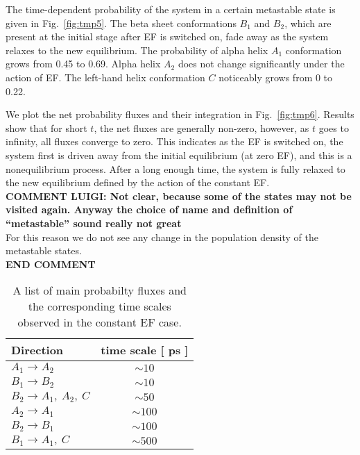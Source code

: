 \documentclass[a4paper,preprint,unsortedaddress,onecolumn]{revtex4-1}
\begin{document}
The time-dependent probability of the system in a certain metastable state is given in
Fig.~\ref{fig:tmp5}. The beta sheet conformations $B_1$ and $B_2$,
which are present at the initial stage after EF is switched on,
fade away as the system relaxes to the new equilibrium. The
probability of alpha helix $A_1$ conformation grows from 0.45 to 0.69.
Alpha helix $A_2$  does not change significantly  under the action of EF.
The left-hand helix conformation $C$ noticeably grows from 0 to 0.22.

We plot the net probability fluxes and their integration in Fig.~\ref{fig:tmp6}.
Results show that for short $t$, the net fluxes are generally non-zero, however, 
as $t$ goes to infinity,
all fluxes converge to zero. This indicates
as the EF is switched on, the system first is driven away from the initial
equilibrium (at zero EF), and this is a nonequilibrium process.
After a long enough time, the system
is fully relaxed to the new equilibrium defined by the action of the constant EF.\\
{\bf COMMENT LUIGI: Not clear, because some of the states may not be visited again. Anyway the choice of name and definition of ``metastable'' sound really not great}\\
For this reason we do not see any change
in the population density of the metastable states.\\
{\bf END COMMENT}\\

\begin{table}
  \centering
  \begin{tabular*}{0.4\textwidth}{@{\extracolsep{\fill}}lc}\hline\hline
    Direction        & time scale [ ps ] \\\hline
    $A_1\rightarrow A_2$        &       $\sim 10$      \\
    $B_1\rightarrow B_2$        &       $\sim 10$      \\    
    $B_2\rightarrow A_1,\ A_2,\ C$        &       $\sim 50$      \\    
    $A_2\rightarrow A_1$        &       $\sim 100$      \\
    $B_2\rightarrow B_1$        &       $\sim 100$      \\    
    $B_1\rightarrow A_1,\ C$        &       $\sim 500$      \\    \hline\hline
  \end{tabular*}
  \caption{A list of main probabilty fluxes and the corresponding time scales observed in the constant EF case.}
  \label{tab:tmp1}
\end{table}
\end{document}
